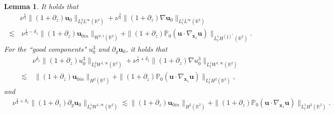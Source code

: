 \documentclass[11pt,reqno]{article}
\newtheorem{lemm}[theo]{Lemma}
\numberwithin{equation}{section}
\newcommand\R{{\mathbb R}}
\newcommand\PP{{\mathbb P}}
\newcommand\x{\bm{x}}
\newcommand\uu{\bm{u}}
\let\pa=\partial
\let\f=\frac
\begin{document}
\begin{lemm}\label{lemm-str}
It holds that
\begin{align}
	&\nu^{\f14}\|(1+\pa_z)\uu_0\|_{L^2_tL^\infty(\R^2)}
	+\nu^{\f34}\|(1+\pa_z)\nabla\uu_0\|_{L^1_tL^\infty(\R^2)}
    \nonumber\\
	\lesssim&~ \nu^{\f{1}{4}-\delta_1}\|(1+\pa_z)\uu_{0in}\|_{W^{2,1}(\R^2)}+\|(1+\pa_z)\PP_0(\uu\cdot\nabla_{\x_1}  \uu)\|_{L^1_tH^{(\f12)^+}(\R^2)}.
	\label{Lipdecay-1}
\end{align}
For the ``good components" $u_0^3$ and $\pa_y\uu_0$, it holds that
\begin{align}
	&\nu^{\delta_1}\|(1+\pa_z)u_0^3\|_{L^2_tW^{1,\infty}(\R^2)}
	+\nu^{\f12+\delta_1}\|(1+\pa_z)\nabla u_0^3\|_{L^1_tW^{1,\infty}(\R^2)}
	\nonumber
	\\
	\lesssim &~
	\|(1+\pa_z)\uu_{0in}\|_{H^{2}(\R^2)}+\|(1+\pa_z)\PP_0(\uu\cdot\nabla_{\x_1}  \uu)\|_{L^1_t H^{2}(\R^2)},
	\label{Lipdecay-2}
    \end{align}
    and
    \begin{align}
   & \nu^{\f12+\delta_1}\|(1+\pa_z)\pa_y \uu_0\|_{L^1_t W^{1,\infty}(\R^2)} \lesssim 
	\|(1+\pa_z)\uu_{0in}\|_{H^{{2}}(\R^2)}+\|(1+\pa_z)\PP_0(\uu\cdot\nabla_{\x_1}  \uu)\|_{L^1_t H^{2}(\R^2)}. \label{Lipdecay-3}
\end{align}


\end{lemm}
\end{document}
